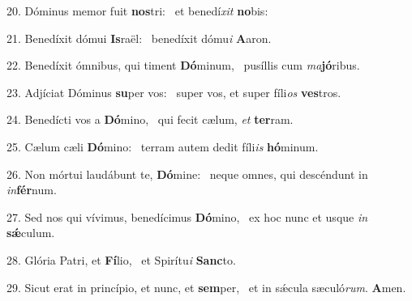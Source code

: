 20. Dóminus memor fuit \textbf{nos}tri: \ast\  et benedí\textit{xit} \textbf{no}bis:\

21. Benedíxit dómui \textbf{Is}raël: \ast\  benedíxit dómu\textit{i} \textbf{A}aron.\

22. Benedíxit ómnibus, qui timent \textbf{Dó}minum, \ast\  pusíllis cum \textit{ma}\textbf{jó}ribus.\

23. Adjíciat Dóminus \textbf{su}per vos: \ast\  super vos, et super fíli\textit{os} \textbf{ves}tros.\

24. Benedícti vos a \textbf{Dó}mino, \ast\  qui fecit cælum, \textit{et} \textbf{ter}ram.\

25. Cælum cæli \textbf{Dó}mino: \ast\  terram autem dedit fíli\textit{is} \textbf{hó}minum.\

26. Non mórtui laudábunt te, \textbf{Dó}mine: \ast\  neque omnes, qui descéndunt in \textit{in}\textbf{fér}num.\

27. Sed nos qui vívimus, benedícimus \textbf{Dó}mino, \ast\  ex hoc nunc et usque \textit{in} \textbf{sǽ}culum.\

28. Glória Patri, et \textbf{Fí}lio, \ast\  et Spirítu\textit{i} \textbf{Sanc}to.\

29. Sicut erat in princípio, et nunc, et \textbf{sem}per, \ast\  et in sǽcula sæculó\textit{rum}. \textbf{A}men.\

